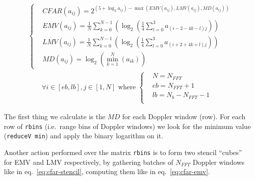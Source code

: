 \documentclass[
  a4paper,
]{article}
\begin{document}
\begin{equation}\begin{aligned}&\left\{\begin{aligned}
  &CFAR(a_{ij})= 2^{(5 + \log_2 a_{ij}) - \max (EMV(a_{ij}),LMV(a_{ij}),MD(a_{ij}))}\\
  &EMV(a_{ij}) = \frac{1}{N}\sum_{k=0}^{N-1}\left(\log_2\left(\frac{1}{4}\sum_{l=0}^{3}a_{(i-2-4k-l)j}\right)\right)\\
  &LMV(a_{ij}) = \frac{1}{N}\sum_{k=0}^{N-1}\left(\log_2\left(\frac{1}{4}\sum_{l=0}^{3}a_{(i+2+4k+l)j}\right)\right)\\
  &MD(a_{ij})  = \log_{2}\left(\min_{k=1}^N(a_{ik})\right)
  \end{aligned}\right.\\
  &\qquad \forall i\in[eb,lb], j\in[1,N] \text{ where }\left\{
  \begin{aligned}
  &N = N_{FFT}\\
  &eb = N_{FFT} + 1\\
  &lb = N_b - N_{FFT} - 1\\
  \end{aligned}\right.
  \end{aligned}
\label{eq:cfar}\end{equation}

The first thing we calculate is the \(MD\) for each Doppler window
(row). For each row of \texttt{rbins} (i.e.~range bins of Doppler
windows) we look for the minimum value (\texttt{reduceV\ min}) and apply
the binary logarithm on it.

Another action performed over the matrix \texttt{rbins} is to form two
stencil ``cubes'' for EMV and LMV respectively, by gathering batches of
\(N_{FFT}\) Doppler windows like in eq.~\ref{eq:cfar-stencil}, computing
them like in eq.~\ref{eq:cfar-emv}.
\end{document}
